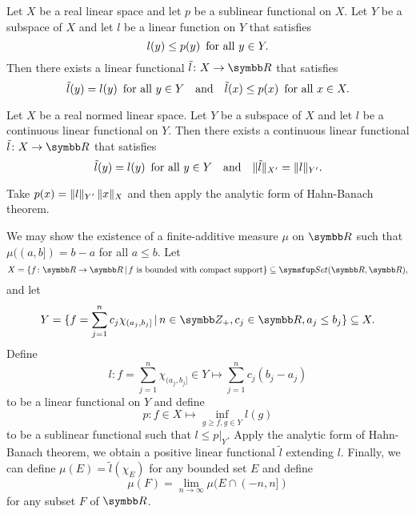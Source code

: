 \begin{theorem}
  Let $X$ be a real linear space and let $p$ be a sublinear functional on $X$. Let $Y$ be a subspace of $X$ and let $l$ be a linear function on $Y$ that satisfies
  \begin{equation*}
    l(y)\leq p(y) \text{\enskip for all } y\in Y.
  \end{equation*}
  Then there exists a linear functional $\tilde l\colon X\to\RR$ that satisfies
  \begin{equation*}
    \tilde l(y)=l(y)\text{\enskip for all }y\in Y\text{\quad and\quad} \tilde l(x)\leq p(x) \text{\enskip for all } x\in X.
  \end{equation*}
\end{theorem}

\begin{corollary}
  Let $X$ be a real normed linear space. Let $Y$ be a subspace of $X$ and let $l$ be a continuous linear functional on $Y$. Then there exists a continuous linear functional $\tilde l\colon X\to\RR$ that satisfies
  \begin{equation*}
    \tilde l(y)=l(y)\text{\enskip for all }y\in Y\text{\quad and\quad} \Vert\tilde l\Vert_{X'}=\Vert l\Vert_{Y'}.
  \end{equation*}
\end{corollary}

\begin{hint}
  Take $p(x)=\Vert l\Vert_{Y'}\,\Vert x\Vert_X$ and then apply the analytic form of Hahn-Banach theorem.
\end{hint}

\begin{example}
  We may show the existence of a finite-additive measure $\mu$ on $\RR$ such that $\mu((a, b])=b-a$ for all $a\leq b$. Let
  \begin{equation*}
    X = \{f\colon\RR\to\RR\VERT f\text{ is bounded with compact support}\}\subseteq\CAT{Set}(\RR, \RR),
  \end{equation*}
  and let
  \begin{equation*}
    Y = \{f=\sum_{j=1}^nc_j\chi_{(a_j, b_j]}\VERT n\in\ZZ_+, c_j\in\RR, a_j\leq b_j\}\subseteq X.
  \end{equation*}
  Define
  \begin{equation*}
    l\colon f=\sum_{j=1}^n\chi_{(a_j, b_j]}\in Y\mapsto \sum_{j=1}^n c_j(b_j-a_j)
  \end{equation*}
  to be a linear functional on $Y$ and define
  \begin{equation*}
    p\colon f\in X\mapsto \inf_{g\geq f, g\in Y}l(g)
  \end{equation*}
  to be a sublinear functional such that $l\leq p\vert_Y$. Apply the analytic form of Hahn-Banach theorem, we obtain a positive linear functional $\tilde l$ extending $l$. Finally, we can define $\mu(E)=\tilde l(\chi_E)$ for any bounded set $E$ and define
  \begin{equation*}
    \mu(F)=\lim_{n\to\infty}\mu(E\cap (-n, n])
  \end{equation*}
  for any subset $F$ of $\RR$.
\end{example}

